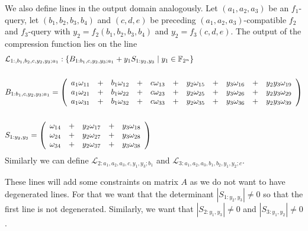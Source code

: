 \documentclass[12pt,a4paper]{article}
\newcommand{\lone}{\mathcal{L}_{1:,b_1,b_2,c,y_2,y_3;a_1}}
\newcommand{\ltwo}{\mathcal{L}_{2:a_1,a_2,a_3,c,y_1,y_3;b_1}}
\newcommand{\lthree}{\mathcal{L}_{3:a_1,a_2,a_3,b_1,b_2,y_1,y_2;c}}
\begin{document}
We also define lines in the output domain analogously. Let $(a_1,a_2,a_3)$ be an $f_1$-query, let $(b_1,b_2,b_3,b_4)$ and $(c,d,e)$ be preceding $(a_1,a_2,a_3)$-compatible $f_2$ and 
$f_3$-query with $y_2 = f_2(b_1,b_2,b_3,b_4)$ and $y_2 = f_3(c,d,e)$. The output of the compression function lies on the line
\[
    \begin{split}
        &\lone:  \left\{ B_{1:b_1,c,y_2,y_3;a_1}+ y_1 S_{1:y_2,y_3} \mid y_1 \in \mathbb{F}_{2^n}  \right\}\\
        &\\
        &B_{1:b_1,c,y_2,y_3;a_1} = \left(\begin{array}{l c l c l c l c l c l} 
            a_1\omega_{11} &+& b_1\omega_{12} &+& c\omega_{13} &+& y_2\omega_{15} &+& y_3\omega_{16} &+& y_2y_3\omega_{19} \\
            a_1\omega_{21} &+& b_1\omega_{22} &+& c\omega_{23} &+& y_2\omega_{25} &+& y_3\omega_{26} &+& y_2y_3\omega_{29} \\
            a_1\omega_{31} &+& b_1\omega_{32} &+& c\omega_{33} &+& y_2\omega_{35} &+& y_3\omega_{36} &+& y_2y_3\omega_{39} \\
        \end{array}\right)\\
        &\\
        &S_{1:y_2,y_3} =
        \left(\begin{array}{l c l c l}
            \omega_{14} &+& y_2\omega_{17} &+& y_3\omega_{18} \\
            \omega_{24} &+& y_2\omega_{27} &+& y_3\omega_{28} \\
            \omega_{34} &+& y_2\omega_{37} &+& y_3\omega_{38} \\
        \end{array}\right)
    \end{split}
\]
Similarly we can define $\ltwo$ and $\lthree$.

These lines will add some constraints on matrix $A$ as we do not want to have degenerated lines. For that we want that the determinant 
$|S_{1:y_2,y_3}| \neq 0$ so that the first line is not degenerated. Similarly, we want that $|S_{2:y_1,y_3}|\neq 0$ and $|S_{3:y_1,y_2}|\neq 0$.
\end{document}
